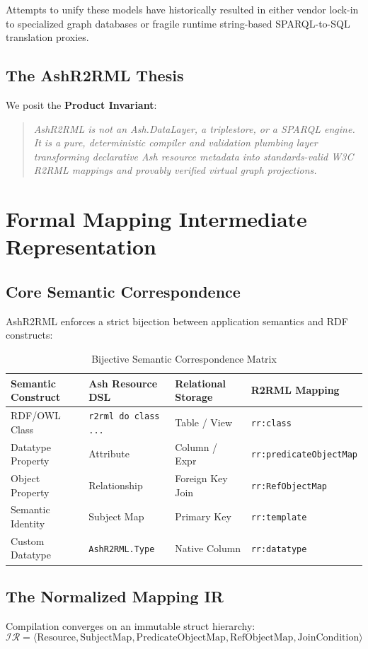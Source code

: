 \documentclass[12pt,a4paper,oneside]{book}
\begin{document}
Attempts to unify these models have historically resulted in either vendor lock-in to specialized graph databases or fragile runtime string-based SPARQL-to-SQL translation proxies.

\section{The AshR2RML Thesis}
We posit the \textbf{Product Invariant}:
\begin{quote}
\textit{AshR2RML is not an Ash.DataLayer, a triplestore, or a SPARQL engine. It is a pure, deterministic compiler and validation plumbing layer transforming declarative Ash resource metadata into standards-valid W3C R2RML mappings and provably verified virtual graph projections.}
\end{quote}

\chapter{Formal Mapping Intermediate Representation}

\section{Core Semantic Correspondence}
AshR2RML enforces a strict bijection between application semantics and RDF constructs:

\begin{table}[h!]
\centering
\begin{tabular}{@{}llll@{}}
\toprule
\textbf{Semantic Construct} & \textbf{Ash Resource DSL} & \textbf{Relational Storage} & \textbf{R2RML Mapping} \\ \midrule
RDF/OWL Class & \texttt{r2rml do class ...} & Table / View & \texttt{rr:class} \\
Datatype Property & Attribute & Column / Expr & \texttt{rr:predicateObjectMap} \\
Object Property & Relationship & Foreign Key Join & \texttt{rr:RefObjectMap} \\
Semantic Identity & Subject Map & Primary Key & \texttt{rr:template} \\
Custom Datatype & \texttt{AshR2RML.Type} & Native Column & \texttt{rr:datatype} \\ \bottomrule
\end{tabular}
\caption{Bijective Semantic Correspondence Matrix}
\end{table}

\section{The Normalized Mapping IR}
Compilation converges on an immutable struct hierarchy:
$$\mathcal{IR} = \langle \text{Resource}, \text{SubjectMap}, \text{PredicateObjectMap}, \text{RefObjectMap}, \text{JoinCondition} \rangle$$
\end{document}
